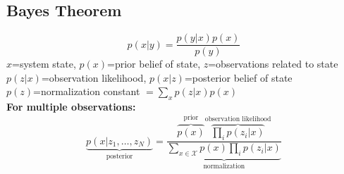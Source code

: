 \subsection{Bayes Theorem}
    \begin{equation*}
        p(x|y) = \frac{p(y|x)p(x)}{p(y)}
    \end{equation*}
    $x$=system state, $p(x)$=prior belief of state, $z$=observations related to state
    $p(z|x)$=observation likelihood, $p(x|z)$=posterior belief of state \\
    $p(z)$=normalization constant $=\textstyle\sum_x p(z|x)p(x)$ \\
    \textbf{For multiple observations:}
    \begin{equation*}
        \underbrace{p(x|z_1, \ldots, z_N)}_{\text{posterior}} =\frac{\overbrace{p(x)}^{\text{prior}} \overbrace{\prod_i p(z_i|x)}^{\text{observation likelihood}} }{\underbrace{\sum_{x\in\mathcal{X} }p(x) \prod_i p(z_i|x)}_{\text{normalization}}}
    \end{equation*}
